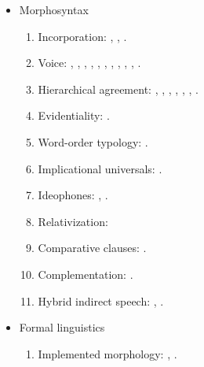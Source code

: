 \documentclass[oneside,a4paper,11pt]{article}
\newcommand{\langue}[2]{#1}
\begin{document}
\begin{itemize}
\begin{itemize}
\item \langue{Morphosyntax}{Morphosyntaxe}
\begin{enumerate}
\item  Incorporation: \citet{jacques11tangut.verb}, \citet{jacques12demotion}, \citet{jacques12incorp}.
\item  \langue{Voice}{Voix}:  \citet{jacques07passif}, \citet{jacques10refl}, \citet{jacques12demotion}, \citet{jacques13derivational.khaling}, \citet{jacques13tropative}, \citet{jacques14antipassive}, \citet{jacques15derivational.khaling}, \citet{jacques15causative},  \citet{jacques15spontaneous},  \citealt{jacques16si}, \citet{jacques17generic}.
\item \langue{Hierarchical agreement}{Indexation hiérarchique}:  \citet{jacques10inverse},     \citet{jacques12khaling},   \citet{antonov14rtau}, \citet{jacques14inverse}, \citet{jacques14rtau}, \citet{jacques16th}, \citet{jacques17stau}.
\item \langue{Evidentiality}{Evidentialité}: \citet{jacques14auditory}.
\item \langue{Word-order typology}{Typologie de l'ordre des mots}: \citet{jacques13harmonization}.
\item \langue{Implicational universals}{Universels implicationnels}: \citet{antonov14need}.
\item \langue{Ideophones}{Idéophones}: \citet{japhug14ideophones}, \citet{jacques17ipa}.
\item \langue{Relativization}{Relatives}: \citet{jacques16relatives}
\item \langue{Comparative clauses}{Comparatives}: \citet{jacques16comparative}.
\item \langue{Complementation}{Complétives}: \citet{jacques16complementation}.
\item \langue{Hybrid indirect speech}{Discours indirect hybride}: \citet{jacques16complementation}, \citet{jacques17stau}.
\end{enumerate}

\item \langue{Formal linguistics}{Linguistique formelle}
\begin{enumerate}
\item \langue{Implemented morphology}{Morphologie implémentée}: \citet{walther14inv.canon}, \citet{walther14compactness}.
\end{enumerate}


\end{itemize}
\end{itemize}
\end{document}

